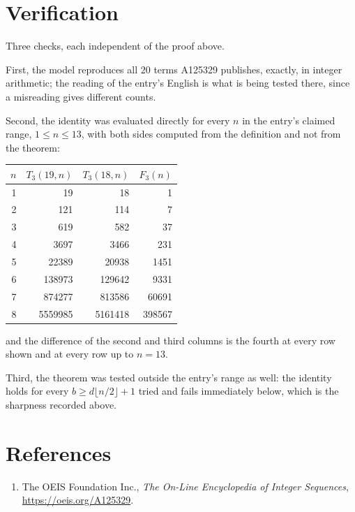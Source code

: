 \documentclass[11pt,a4paper]{article}
\theoremstyle{plain}
\theoremstyle{definition}
\begin{document}
\section{Verification}

Three checks, each independent of the proof above.

First, the model reproduces all $20$ terms A125329 publishes, exactly, in integer
arithmetic; the reading of the entry's English is what is being tested there, since a
misreading gives different counts.

Second, the identity was evaluated directly for every $n$ in the entry's claimed range,
$1\le n\le13$, with both sides computed from the definition and not from the theorem:

\begin{center}
\begin{tabular}{rrrr}
$n$ & $T_{3}(19,n)$ & $T_{3}(18,n)$ & $F_{3}(n)$ \\ \hline
1 & 19 & 18 & 1 \\
2 & 121 & 114 & 7 \\
3 & 619 & 582 & 37 \\
4 & 3697 & 3466 & 231 \\
5 & 22389 & 20938 & 1451 \\
6 & 138973 & 129642 & 9331 \\
7 & 874277 & 813586 & 60691 \\
8 & 5559985 & 5161418 & 398567 \\
\end{tabular}
\end{center}

\noindent and the difference of the second and third columns is the fourth at every row shown
and at every row up to $n=13$.

Third, the theorem was tested outside the entry's range as well: the identity holds for every
$b\ge d\lfloor n/2\rfloor+1$ tried and fails immediately below, which is the sharpness recorded
above.

\section*{References}
\begin{enumerate}
\item The OEIS Foundation Inc., \emph{The On-Line Encyclopedia of Integer Sequences},
\url{https://oeis.org/A125329}.
\end{enumerate}
\end{document}
